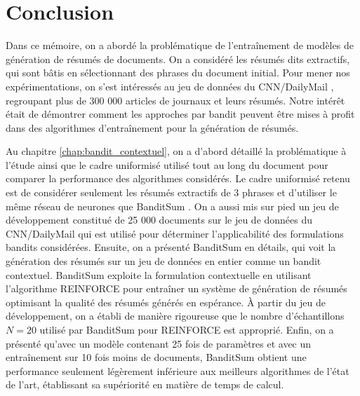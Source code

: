 \chapter*{Conclusion}           %
\label{chap:conclusion}         %

Dans ce mémoire, on a abordé la problématique de 
l'entraînement de modèles de génération de résumés de documents.
On a considéré les résumés dits extractifs, qui sont bâtis 
en sélectionnant des phrases du document initial.
Pour mener nos expérimentations, on s'est intéressés 
au jeu de données du CNN/DailyMail \citep{hermann2015teaching}, 
regroupant plus de 300 000 articles de journaux et leurs résumés.
Notre intérêt était de démontrer comment les approches par bandit 
\citep{Robbins:1952} peuvent être mises à profit dans des algorithmes d'entraînement 
pour la génération de résumés.

Au chapitre \ref{chap:bandit_contextuel}, on a d'abord détaillé 
la problématique à l'étude ainsi que le cadre uniformisé 
utilisé tout au long du document pour comparer la performance
des algorithmes considérés.
Le cadre uniformisé retenu est de considérer seulement les résumés extractifs de 
3 phrases et d'utiliser le même réseau de neurones que BanditSum \citep{dong2018banditsum}.
On a aussi mis sur pied un jeu de développement constitué de 25 000 
documents sur le jeu de données du CNN/DailyMail qui est utilisé pour 
déterminer l'applicabilité des formulations bandits considérées.
Ensuite, on a présenté BanditSum en détails, qui voit la génération 
des résumés sur un jeu de données en entier comme un bandit contextuel.
BanditSum exploite la formulation contextuelle en utilisant l'algorithme REINFORCE \citep{williams1992simple} 
pour entraîner un système de génération de résumés optimisant la qualité des résumés 
générés en espérance.
À partir du jeu de développement, on a établi de manière rigoureuse 
que le nombre d'échantillons $N=20$ utilisé par BanditSum pour REINFORCE 
est approprié.
Enfin, on a présenté qu'avec un modèle contenant 25 fois de paramètres 
et avec un entraînement sur 10 fois moins de documents, BanditSum 
obtient une performance seulement légèrement inférieure aux meilleurs 
algorithmes de l'état de l'art, établissant sa supériorité 
en matière de temps de calcul.

